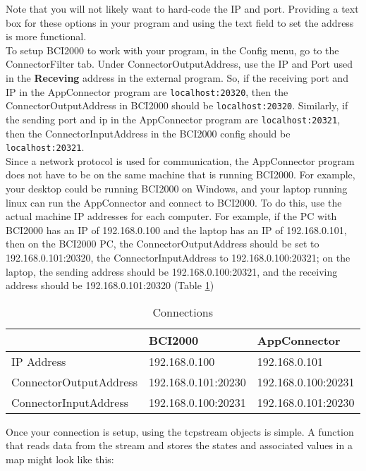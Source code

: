 Note that you will not likely want to hard-code the IP and port. Providing a text box for these options in your program and using the text field to set the address is more functional.\\
To setup BCI2000 to work with your program, in the Config menu, go to the ConnectorFilter tab. Under ConnectorOutputAddress, use the IP and Port used in the \textbf{Receving} address in the external program. So, if the receiving port and IP in the AppConnector program are \texttt{localhost:20320}, then the ConnectorOutputAddress in BCI2000 should be \texttt{localhost:20320}. Similarly, if the sending port and ip in the AppConnector program are \texttt{localhost:20321}, then the ConnectorInputAddress in the BCI2000 config should be \texttt{localhost:20321}.\\
Since a network protocol is used for communication, the AppConnector program does not have to be on the same machine that is running BCI2000. For example, your desktop could be running BCI2000 on Windows, and your laptop running linux can run the AppConnector and connect to BCI2000. To do this, use the actual machine IP addresses for each computer. For example, if the PC with BCI2000 has an IP of 192.168.0.100 and the laptop has an IP of 192.168.0.101, then on the BCI2000 PC, the ConnectorOutputAddress should be set to 192.168.0.101:20320, the ConnectorInputAddress to 192.168.0.100:20321; on the laptop, the sending address should be 192.168.0.100:20321, and the receiving address should be 192.168.0.101:20320 (Table \ref{tab:connect}) 

\begin{table}
 \begin{center}
\begin{tabular}{l | l |l}
\hline
 & BCI2000 & AppConnector \\ 
\hline
IP Address & 192.168.0.100 & 192.168.0.101 \\ 
ConnectorOutputAddress & 192.168.0.101:20230 & 192.168.0.100:20231 \\ 
ConnectorInputAddress & 192.168.0.100:20231 & 192.168.0.101:20230\\
\hline
\end{tabular}

\end{center}

\caption{Connections}
\label{tab:connect}
\end{table} 

Once your connection is setup, using the tcpstream objects is simple. A function that reads data from the stream and stores the states and associated values in a map might look like this:

